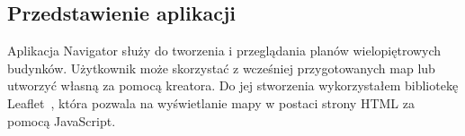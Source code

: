 \subsection{Przedstawienie aplikacji}

Aplikacja Navigator służy do tworzenia i przeglądania planów wielopiętrowych budynków.
Użytkownik może skorzystać z wcześniej przygotowanych map lub utworzyć własną za pomocą kreatora.
Do jej stworzenia wykorzystałem bibliotekę Leaflet~\cite{leafletGithub}, 
która pozwala na wyświetlanie mapy w postaci strony HTML za pomocą JavaScript.
